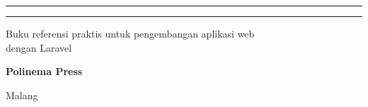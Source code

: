 \begin{titlepage}
    \vfill

    \begin{minipage}{1\textwidth}
        \centering
        \rule{0.25\textwidth}{0.6pt}\hspace{0.03\textwidth}\rule{0.25\textwidth}{0.6pt}\par
        \vspace{0.35cm}
        {\small\sffamily Buku referensi praktis untuk pengembangan aplikasi web\\dengan Laravel\par}
        \vspace{0.75cm}
        {\normalsize\bfseries Polinema Press\par}
        {\normalsize Malang \textbullet{} \the\year\par}
    \end{minipage}

\end{titlepage}

\cleardoublepage

